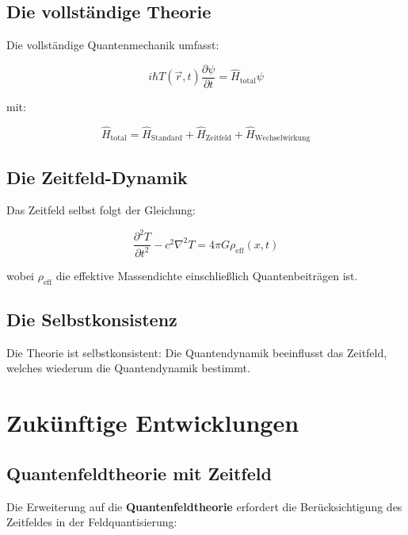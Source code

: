\documentclass[12pt,a4paper]{report}
\begin{document}
	\subsection{Die vollständige Theorie}
	
	Die vollständige Quantenmechanik umfasst:
	
	\begin{equation}
		i\hbar T(\vec{r},t)\frac{\partial\psi}{\partial t} = \hat{H}_{\text{total}}\psi
	\end{equation}
	
	mit:
	
	\begin{equation}
		\hat{H}_{\text{total}} = \hat{H}_{\text{Standard}} + \hat{H}_{\text{Zeitfeld}} + \hat{H}_{\text{Wechselwirkung}}
	\end{equation}
	
	\subsection{Die Zeitfeld-Dynamik}
	
	Das Zeitfeld selbst folgt der Gleichung:
	
	\begin{equation}
		\frac{\partial^2 T}{\partial t^2} - c^2\nabla^2 T = 4\pi G \rho_{\text{eff}}(x,t)
	\end{equation}
	
	wobei $\rho_{\text{eff}}$ die effektive Massendichte einschließlich Quantenbeiträgen ist.
	
	\subsection{Die Selbstkonsistenz}
	
	Die Theorie ist selbstkonsistent: Die Quantendynamik beeinflusst das Zeitfeld, welches wiederum die Quantendynamik bestimmt.
	
	\section{Zukünftige Entwicklungen}
	
	\subsection{Quantenfeldtheorie mit Zeitfeld}
	
	Die Erweiterung auf die \textbf{Quantenfeldtheorie} erfordert die Berücksichtigung des Zeitfeldes in der Feldquantisierung:
	
\end{document}

